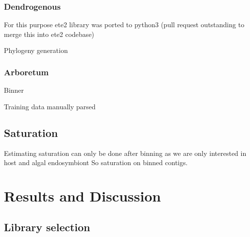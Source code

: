 






\subsubsection{Dendrogenous}
For this purpose ete2 library was ported to python3 (pull request outstanding to merge this into ete2 codebase)


Phylogeny generation


\subsubsection{Arboretum}
Binner 

Training data manually parsed



\subsection{Saturation}
Estimating saturation can only be done after binning as we are only interested in host and algal endosymbiont
So saturation on binned contigs.




\section{Results and Discussion} 

\subsection{Library selection}

